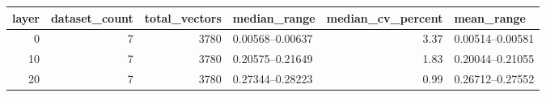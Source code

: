 \begin{tabular}{rrrlrl}
\toprule
layer & dataset_count & total_vectors & median_range & median_cv_percent & mean_range \\
\midrule
0 & 7 & 3780 & 0.00568--0.00637 & 3.37 & 0.00514--0.00581 \\
10 & 7 & 3780 & 0.20575--0.21649 & 1.83 & 0.20044--0.21055 \\
20 & 7 & 3780 & 0.27344--0.28223 & 0.99 & 0.26712--0.27552 \\
\bottomrule
\end{tabular}
